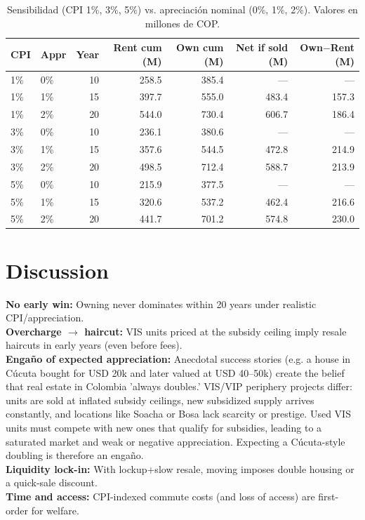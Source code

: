 \documentclass[12pt]{article}
\begin{document}
\begin{table}[h]
\centering
\small
\begin{tabular}{llrrrrr}
\hline
CPI & Appr & Year & Rent cum (M) & Own cum (M) & Net if sold (M) & Own$-$Rent (M) \\
\hline
1\% & 0\% & 10 & 258.5 & 385.4 & --- & --- \\
1\% & 1\% & 15 & 397.7 & 555.0 & 483.4 & 157.3 \\
1\% & 2\% & 20 & 544.0 & 730.4 & 606.7 & 186.4 \\
3\% & 0\% & 10 & 236.1 & 380.6 & --- & --- \\
3\% & 1\% & 15 & 357.6 & 544.5 & 472.8 & 214.9 \\
3\% & 2\% & 20 & 498.5 & 712.4 & 588.7 & 213.9 \\
5\% & 0\% & 10 & 215.9 & 377.5 & --- & --- \\
5\% & 1\% & 15 & 320.6 & 537.2 & 462.4 & 216.6 \\
5\% & 2\% & 20 & 441.7 & 701.2 & 574.8 & 230.0 \\ \hline
\end{tabular}
\caption{Sensibilidad (CPI 1\%, 3\%, 5\%) vs. apreciaci\'on nominal (0\%, 1\%, 2\%). Valores en millones de COP.}
\label{tab:sensitivity}
\end{table}


\section*{Discussion}
\textbf{No early win:} Owning never dominates within 20 years under realistic CPI/appreciation.\\
\textbf{Overcharge $\rightarrow$ haircut:} VIS units priced at the subsidy ceiling imply resale haircuts in early years (even before fees).\\
\textbf{Engaño of expected appreciation:} Anecdotal success stories (e.g. a house in Cúcuta bought for USD 20k and later valued at USD 40–50k) create the belief that real estate in Colombia 'always doubles.' VIS/VIP periphery projects differ: units are sold at inflated subsidy ceilings, new subsidized supply arrives constantly, and locations like Soacha or Bosa lack scarcity or prestige. Used VIS units must compete with new ones that qualify for subsidies, leading to a saturated market and weak or negative appreciation. Expecting a Cúcuta-style doubling is therefore an engaño. \\

\textbf{Liquidity lock-in:} With lockup+slow resale, moving imposes double housing or a quick-sale discount.\\
\textbf{Time and access:} CPI-indexed commute costs (and loss of access) are first-order for welfare.
\end{document}

